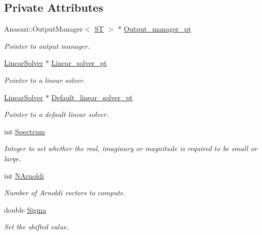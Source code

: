 \subsection*{Private Attributes}
\begin{DoxyCompactItemize}
\item 
Anasazi\+::\+Output\+Manager$<$ \hyperlink{classoomph_1_1ANASAZI_a604b8dc6a0618d81dfce82849d5b47a7}{ST} $>$ $\ast$ \hyperlink{classoomph_1_1ANASAZI_a10a57e0c5468fd511c7458dda6f99dce}{Output\+\_\+manager\+\_\+pt}
\begin{DoxyCompactList}\small\item\em Pointer to output manager. \end{DoxyCompactList}\item 
\hyperlink{classoomph_1_1LinearSolver}{Linear\+Solver} $\ast$ \hyperlink{classoomph_1_1ANASAZI_a4af90db68a430f129f360c00a669e809}{Linear\+\_\+solver\+\_\+pt}
\begin{DoxyCompactList}\small\item\em Pointer to a linear solver. \end{DoxyCompactList}\item 
\hyperlink{classoomph_1_1LinearSolver}{Linear\+Solver} $\ast$ \hyperlink{classoomph_1_1ANASAZI_a0d68fe86419ff9260bd2dd8c5e75b1e8}{Default\+\_\+linear\+\_\+solver\+\_\+pt}
\begin{DoxyCompactList}\small\item\em Pointer to a default linear solver. \end{DoxyCompactList}\item 
int \hyperlink{classoomph_1_1ANASAZI_a244c2eac42edb80948da8bcef92cf003}{Spectrum}
\begin{DoxyCompactList}\small\item\em Integer to set whether the real, imaginary or magnitude is required to be small or large. \end{DoxyCompactList}\item 
int \hyperlink{classoomph_1_1ANASAZI_a4ace6fc3f5e4503d9d1e42eb81c52fd8}{N\+Arnoldi}
\begin{DoxyCompactList}\small\item\em Number of Arnoldi vectors to compute. \end{DoxyCompactList}\item 
double \hyperlink{classoomph_1_1ANASAZI_a7af7f7211016ec745689d203078f6199}{Sigma}
\begin{DoxyCompactList}\small\item\em Set the shifted value. \end{DoxyCompactList}\item 

\end{DoxyCompactItemize}
